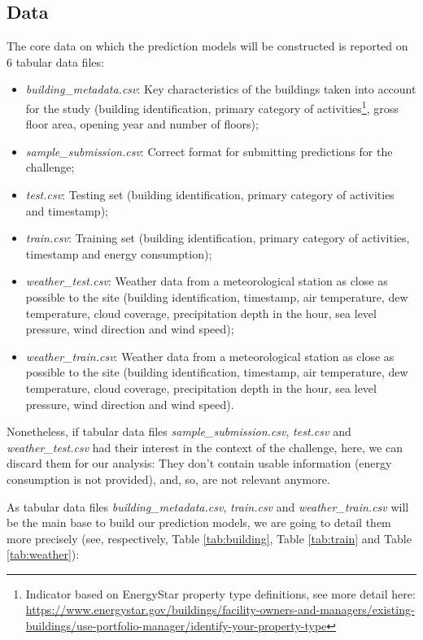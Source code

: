 \documentclass[twocolumn, switch]{article}
\begin{document}
\subsection{Data}

The core data on which the prediction models will be constructed is reported on $6$ tabular data files:
\begin{itemize}
\item \textit{building\_metadata.csv}: Key characteristics of the buildings taken into account for the study (building identification, primary category of activities\footnote{Indicator based on EnergyStar property type definitions, see more detail here: \url{https://www.energystar.gov/buildings/facility-owners-and-managers/existing-buildings/use-portfolio-manager/identify-your-property-type}}, gross floor area, opening year and number of floors);
\item \textit{sample\_submission.csv}: Correct format for submitting predictions for the challenge;
\item \textit{test.csv}: Testing set (building identification, primary category of activities and timestamp);
\item \textit{train.csv}: Training set (building identification, primary category of activities, timestamp and energy consumption);
\item \textit{weather\_test.csv}: Weather data from a meteorological station as close as possible to the site (building identification, timestamp, air temperature, dew temperature, cloud coverage, precipitation depth in the hour, sea level pressure, wind direction and wind speed);
\item \textit{weather\_train.csv}: Weather data from a meteorological station as close as possible to the site (building identification, timestamp, air temperature, dew temperature, cloud coverage, precipitation depth in the hour, sea level pressure, wind direction and wind speed).
\end{itemize}

Nonetheless, if tabular data files \textit{sample\_submission.csv}, \textit{test.csv} and \textit{weather\_test.csv} had their interest in the context of the challenge, here, we can discard them for our analysis: They don't contain usable information (energy consumption is not provided), and, so, are not relevant anymore.

As tabular data files \textit{building\_metadata.csv}, \textit{train.csv} and \textit{weather\_train.csv} will be the main base to build our prediction models, we are going to detail them more precisely (see, respectively, Table \ref{tab:building}, Table \ref{tab:train} and Table \ref{tab:weather}):
\end{document}

